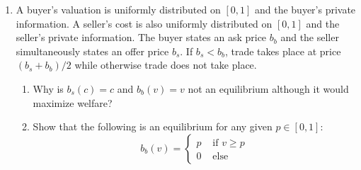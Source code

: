 \documentclass[a4paper,12pt]{article}
\begin{document}
\begin{enumerate}
\item A buyer's valuation is uniformly distributed on $[0,1]$ and the buyer's private information. A seller's cost is also uniformly distributed on $[0,1]$ and the seller's private information. The buyer states an ask price $b_b$ and the seller simultaneously states an offer price $b_s$. If $b_s<b_b$, trade takes place at price $(b_s+b_b)/2$ while otherwise trade does not take place.
  \begin{enumerate}
  \item Why is $b_s(c)=c$ and $b_b(v)=v$ not an equilibrium although it would maximize welfare? 
  \item Show that the following is an equilibrium for any given $p\in[0,1]$:
    \begin{equation*}
      b_b(v)=
      \begin{cases}
        p & \text{ if }v\geq p\\
        0 & \text{ else }

\end{cases}
\end{equation*}
\end{enumerate}
\end{enumerate}
\end{document}
